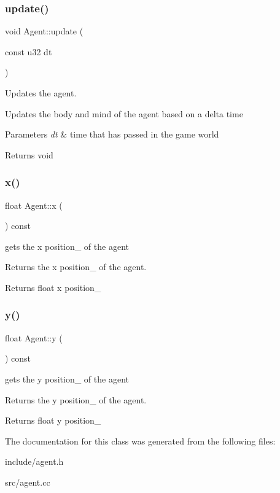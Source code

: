\subsubsection{\texorpdfstring{update()}{update()}}
{\footnotesize\ttfamily void Agent\+::update (\begin{DoxyParamCaption}\item[{const u32}]{dt }\end{DoxyParamCaption})}



Updates the agent. 

Updates the body and mind of the agent based on a delta time


\begin{DoxyParams}{Parameters}
{\em dt} & time that has passed in the game world \\
\hline
\end{DoxyParams}
\begin{DoxyReturn}{Returns}
void 
\end{DoxyReturn}
\mbox{\label{class_agent_a51aac7a6281e83d26d4c85475851cbf4}} 
\subsubsection{\texorpdfstring{x()}{x()}}
{\footnotesize\ttfamily float Agent\+::x (\begin{DoxyParamCaption}{ }\end{DoxyParamCaption}) const}



gets the x position\+\_\+ of the agent 

Returns the x position\+\_\+ of the agent.

\begin{DoxyReturn}{Returns}
float x position\+\_\+ 
\end{DoxyReturn}
\mbox{\label{class_agent_a077acfc535e9ef3b0630beaa818627a4}} 
\subsubsection{\texorpdfstring{y()}{y()}}
{\footnotesize\ttfamily float Agent\+::y (\begin{DoxyParamCaption}{ }\end{DoxyParamCaption}) const}



gets the y position\+\_\+ of the agent 

Returns the y position\+\_\+ of the agent.

\begin{DoxyReturn}{Returns}
float y position\+\_\+ 
\end{DoxyReturn}


The documentation for this class was generated from the following files\+:\begin{DoxyCompactItemize}
\item 
include/agent.\+h\item 
src/agent.\+cc\end{DoxyCompactItemize}
